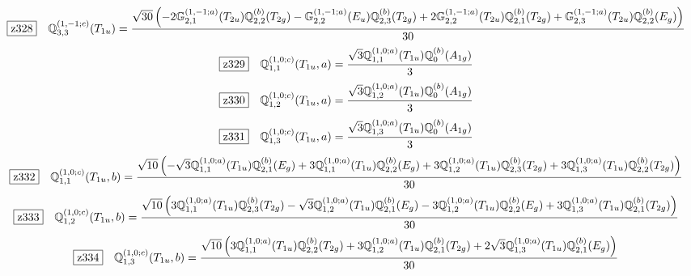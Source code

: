 \documentclass[fleqn,10pt,landscape]{jsarticle}
\begin{document}
\begin{dmath*}
\hspace*{3mm}\fbox{z328}\quad \mathbb{Q}_{3,3}^{(1,-1;c)}(T_{1u})=\frac{\sqrt{30} \left(- 2 \mathbb{G}_{2,1}^{(1,-1;a)}(T_{2u}) \mathbb{Q}_{2,2}^{(b)}(T_{2g}) - \mathbb{G}_{2,2}^{(1,-1;a)}(E_{u}) \mathbb{Q}_{2,3}^{(b)}(T_{2g}) + 2 \mathbb{G}_{2,2}^{(1,-1;a)}(T_{2u}) \mathbb{Q}_{2,1}^{(b)}(T_{2g}) + \mathbb{G}_{2,3}^{(1,-1;a)}(T_{2u}) \mathbb{Q}_{2,2}^{(b)}(E_{g})\right)}{30}
\end{dmath*}
\begin{dmath*}
\hspace*{3mm}\fbox{z329}\quad \mathbb{Q}_{1,1}^{(1,0;c)}(T_{1u},a)=\frac{\sqrt{3} \mathbb{Q}_{1,1}^{(1,0;a)}(T_{1u}) \mathbb{Q}_{0}^{(b)}(A_{1g})}{3}
\end{dmath*}
\begin{dmath*}
\hspace*{3mm}\fbox{z330}\quad \mathbb{Q}_{1,2}^{(1,0;c)}(T_{1u},a)=\frac{\sqrt{3} \mathbb{Q}_{1,2}^{(1,0;a)}(T_{1u}) \mathbb{Q}_{0}^{(b)}(A_{1g})}{3}
\end{dmath*}
\begin{dmath*}
\hspace*{3mm}\fbox{z331}\quad \mathbb{Q}_{1,3}^{(1,0;c)}(T_{1u},a)=\frac{\sqrt{3} \mathbb{Q}_{1,3}^{(1,0;a)}(T_{1u}) \mathbb{Q}_{0}^{(b)}(A_{1g})}{3}
\end{dmath*}
\begin{dmath*}
\hspace*{3mm}\fbox{z332}\quad \mathbb{Q}_{1,1}^{(1,0;c)}(T_{1u},b)=\frac{\sqrt{10} \left(- \sqrt{3} \mathbb{Q}_{1,1}^{(1,0;a)}(T_{1u}) \mathbb{Q}_{2,1}^{(b)}(E_{g}) + 3 \mathbb{Q}_{1,1}^{(1,0;a)}(T_{1u}) \mathbb{Q}_{2,2}^{(b)}(E_{g}) + 3 \mathbb{Q}_{1,2}^{(1,0;a)}(T_{1u}) \mathbb{Q}_{2,3}^{(b)}(T_{2g}) + 3 \mathbb{Q}_{1,3}^{(1,0;a)}(T_{1u}) \mathbb{Q}_{2,2}^{(b)}(T_{2g})\right)}{30}
\end{dmath*}
\begin{dmath*}
\hspace*{3mm}\fbox{z333}\quad \mathbb{Q}_{1,2}^{(1,0;c)}(T_{1u},b)=\frac{\sqrt{10} \left(3 \mathbb{Q}_{1,1}^{(1,0;a)}(T_{1u}) \mathbb{Q}_{2,3}^{(b)}(T_{2g}) - \sqrt{3} \mathbb{Q}_{1,2}^{(1,0;a)}(T_{1u}) \mathbb{Q}_{2,1}^{(b)}(E_{g}) - 3 \mathbb{Q}_{1,2}^{(1,0;a)}(T_{1u}) \mathbb{Q}_{2,2}^{(b)}(E_{g}) + 3 \mathbb{Q}_{1,3}^{(1,0;a)}(T_{1u}) \mathbb{Q}_{2,1}^{(b)}(T_{2g})\right)}{30}
\end{dmath*}
\begin{dmath*}
\hspace*{3mm}\fbox{z334}\quad \mathbb{Q}_{1,3}^{(1,0;c)}(T_{1u},b)=\frac{\sqrt{10} \left(3 \mathbb{Q}_{1,1}^{(1,0;a)}(T_{1u}) \mathbb{Q}_{2,2}^{(b)}(T_{2g}) + 3 \mathbb{Q}_{1,2}^{(1,0;a)}(T_{1u}) \mathbb{Q}_{2,1}^{(b)}(T_{2g}) + 2 \sqrt{3} \mathbb{Q}_{1,3}^{(1,0;a)}(T_{1u}) \mathbb{Q}_{2,1}^{(b)}(E_{g})\right)}{30}
\end{dmath*}
\end{document}
